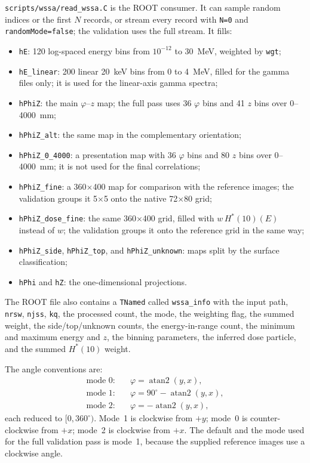 \documentclass[11pt,a4paper]{article}
\begin{document}
\texttt{scripts/wssa/read\_wssa.C} is the ROOT consumer.  It can sample random
indices or the first $N$ records, or stream every record with \texttt{N=0} and
\texttt{randomMode=false}; the validation uses the full stream.  It fills:
\begin{itemize}
  \item \texttt{hE}: 120 log-spaced energy bins from $10^{-12}$ to 30~MeV,
        weighted by \texttt{wgt};
  \item \texttt{hE\_linear}: 200 linear 20~keV bins from 0 to 4~MeV, filled for
        the gamma files only; it is used for the linear-axis gamma spectra;
  \item \texttt{hPhiZ}: the main $\varphi$--$z$ map; the full pass uses
        36 $\varphi$ bins and 41 $z$ bins over 0--4000~mm;
  \item \texttt{hPhiZ\_alt}: the same map in the complementary orientation;
  \item \texttt{hPhiZ\_0\_4000}: a presentation map with 36 $\varphi$ bins and
        80 $z$ bins over 0--4000~mm; it is not used for the final correlations;
  \item \texttt{hPhiZ\_fine}: a 360$\times$400 map for comparison with the
        reference images; the validation groups it 5$\times$5 onto the native
        72$\times$80 grid;
  \item \texttt{hPhiZ\_dose\_fine}: the same 360$\times$400 grid, filled with
        $w\,H^*(10)(E)$ instead of $w$; the validation groups it onto the
        reference grid in the same way;
  \item \texttt{hPhiZ\_side}, \texttt{hPhiZ\_top}, and
        \texttt{hPhiZ\_unknown}: maps split by the surface classification;
  \item \texttt{hPhi} and \texttt{hZ}: the one-dimensional projections.
\end{itemize}
The ROOT file also contains a \texttt{TNamed} called \texttt{wssa\_info} with
the input path, \texttt{nrsw}, \texttt{njss}, \texttt{kq}, the processed count,
the mode, the weighting flag, the summed weight, the side/top/unknown counts,
the energy-in-range count, the minimum and maximum energy and $z$, the
binning parameters, the inferred dose particle, and the summed $H^*(10)$ weight.

The angle conventions are:
\begin{align}
  \text{mode 0:}\quad & \varphi = \operatorname{atan2}(y,x),\\
  \text{mode 1:}\quad & \varphi = 90^\circ - \operatorname{atan2}(y,x),\\
  \text{mode 2:}\quad & \varphi = -\operatorname{atan2}(y,x),
\end{align}
each reduced to $[0,360^\circ)$.  Mode~1 is clockwise from $+y$; mode~0 is
counter-clockwise from $+x$; mode~2 is clockwise from $+x$.  The default and
the mode used for the full validation pass is mode~1, because the supplied
reference images use a clockwise angle.
\end{document}
